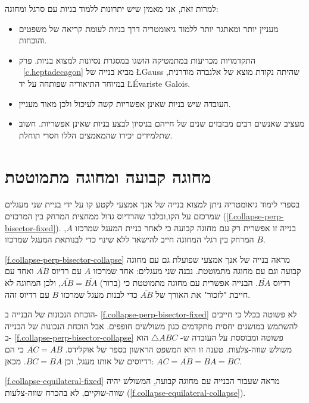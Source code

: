 למרות זאת, אני מאמין שיש יתרונות ללמוד בניות עם סרגל ומחוגה:
\begin{itemize}
\item
מעניין יותר ומאתגר יותר ללמוד גיאומטריה דרך בניות לעומת קריאה של משפטים והוכחות.
\item
התקדמויות מכריעות במתמטיקה הושגו במסגרת נסיונות למצוא בניות. פרק%
~\ref{c.heptadecagon}
מביא בנייה של 
\L{Gauss}
שהיתה נקודת מוצא של אלגברה מודרנית, במיוחד התיאוריה שפותחה על יד 
\L{\'{E}variste Galois}.
\item
העובדה שיש בניות שאינן אפשריות קשה לעיכול ולכן מאוד מעניין.
\item
מעציב שאנשים רבים מבזבזים שנים של חייהם בניסיון לבצע בניות שאינן אפשריות. חשוב שתלמידים יכירו שהמאמצים הללו חסרי תוחלת.
\end{itemize}



\section{מחוגה קבועה ומחוגה מתמוטטת}\label{s.collapse}

בספרי לימוד גיאומטריה ניתן למצוא בנייה של אנך אמצעי לקטע קו על ידי בניית שני מעגלים שמרכזם על הקו,ובלבד שהרדיוס גדול ממחצית המרחק בין המרכזים 
(\ref{f.collapse-perp-bisector-fixed}).
בנייה זו אפשרית רק עם מחוגה קבועה כי לאחר בניית המעגל שמרכזו 
$A$,
המרחק בין רגלי המחוגה חייב להישאר ללא שינוי כדי לבנותאת המעגל שמרכזו 
$B$.

\ref{f.collapse-perp-bisector-collapse}
מראה בנייה של אנך אמצעי שפועלת גם עם מחוגה קבועה וגם עם מחוגה מתמוטטת. נבנה שני מעגלים: אחד שמרכזו 
$A$
עם רדיוס
$\overline{AB}$
ואחד עם רדיוס
$\overline{BA}$.
הבנייה אפשרית עם מחוגה מתמוטטת כי (ברור)
$\overline{AB}=\overline{BA}$,
ולכן המחוגה לא חייבת "לזכור" את האורך של
$\overline{AB}$
כדי לבנות מעגל שמרכזו 
$B$
עם רדיוס זהה.

הוכחת הנכונות של הבנייה ב-%
\ref{f.collapse-perp-bisector-fixed}
לא פשוטה בכלל כי חייבים להשתמש במושגים יחסית מתקדמים כגון משולשים חופפים. אבל הוכחת הנכונות של הבנייה ב-%
\ref{f.collapse-perp-bisector-collapse}
פשוטה ומבוססת על העובדה ש-%
$\triangle ABC$
הוא משולש שווה-צלעות. טענה זו היא המשפט הראשון בספר של אוקלידס. 
$\overline{AC}=\overline{AB}$
כי הם רדיוסים של אותו מעגל, וכן
$\overline{BC}=\overline{BA}$.
מכאן:
$\overline{AC} = \overline{AB} = \overline{BA} = \overline{BC}$.

\ref{f.collapse-equilateral-fixed}
מראה שעבור הבנייה עם מחוגה קבועה, המשולש יהיה שווה-שוקיים, לא בהכרח שווה-צלעות 
(\ref{f.collapse-equilateral-collapse}).

